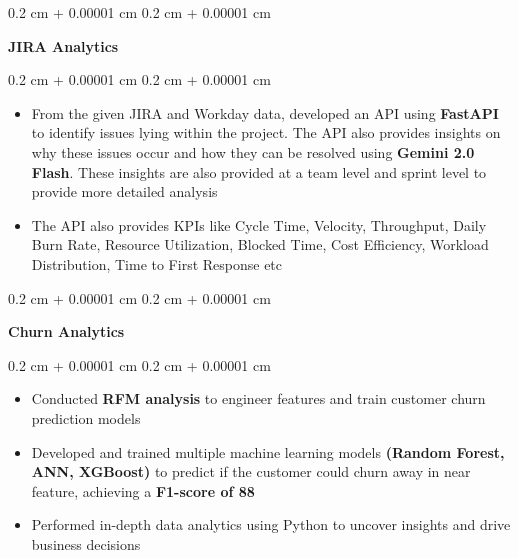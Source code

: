 \documentclass[10pt, letterpaper]{article}
\newenvironment{highlights}{
    \begin{itemize}[
        topsep=0.10 cm,
        parsep=0.10 cm,
        partopsep=0pt,
        itemsep=0pt,
        leftmargin=0.4 cm + 10pt
    ]
}{
    \end{itemize}
} %
\newenvironment{onecolentry}{
    \begin{adjustwidth}{
        0.2 cm + 0.00001 cm
    }{
        0.2 cm + 0.00001 cm
    }
}{
    \end{adjustwidth}
} %
\begin{document}
        \vspace{0.2 cm}

        \begin{onecolentry}
            \textbf{JIRA Analytics}
        \end{onecolentry}
        \vspace{0.10 cm}
        \begin{onecolentry}
            \begin{highlights}
                \item From the given JIRA and Workday data, developed an API using \textbf{FastAPI} to identify issues lying within the project. The API also provides insights on why these issues occur and how they can be resolved using \textbf{Gemini 2.0 Flash}. These insights are also provided at a team level and sprint level to provide more detailed analysis
                \item The API also provides KPIs like Cycle Time, Velocity, Throughput, Daily Burn Rate, Resource Utilization, Blocked Time, Cost Efficiency, Workload Distribution, Time to First Response etc 
            \end{highlights}
        \end{onecolentry}

        \vspace{0.2 cm}
        
        \begin{onecolentry}
            \textbf{Churn Analytics}
        \end{onecolentry}
        \vspace{0.10 cm}
        \begin{onecolentry}
            \begin{highlights}
                \item Conducted \textbf{RFM analysis} to engineer features and train customer churn prediction models
                \item Developed and trained multiple machine learning models \textbf{(Random Forest, ANN, XGBoost)} to predict if the customer could churn away in near feature, achieving a \textbf{F1-score of 88}
                \item Performed in-depth data analytics using Python to uncover insights and drive business decisions
            \end{highlights}
        \end{onecolentry}
\end{document}
